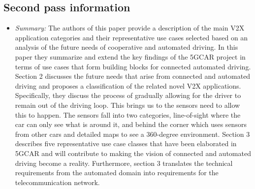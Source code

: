 \documentclass[letterpaper,twocolumn,10pt]{article}
\begin{document}
\subsection{Second pass information}
\label{sec:second}
\begin{itemize}

\item {\it Summary:}
The authors of this paper provide a description of the main V2X application categories and their representative use
cases selected based on an analysis of the future needs of cooperative and automated driving. In this paper they 
summarize and extend the key findings of the 5GCAR project in terms of use cases that form building blocks for 
connected automated driving. Section 2 discusses the future needs that arise from connected and automated 
driving and proposes a classification of the related novel V2X applications. Specifically, they discuss the process 
of gradually allowing for the driver to remain out of the driving loop. This brings us to the sensors need to allow this to
happen. The sensors fall into two categories, line-of-sight where the car can only see what is around it, and behind the
corner which uses sensors from other cars and detailed maps to see a 360-degree environment. Section 3 describes 
five representative use case classes that have been elaborated in 5GCAR and will contribute to making the vision of
connected and automated driving become a reality. Furthermore, section 3 translates the technical requirements from
the automated domain into requirements for the telecommunication network. 

\end{itemize}
\end{document}
